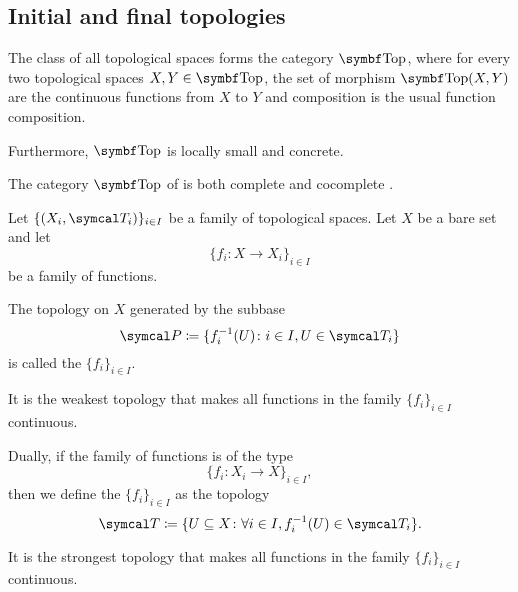 \subsection{Initial and final topologies}\label{subsec:initial_final_topologies}

\begin{definition}\label{def:category_of_topological_spaces}
  The class of all topological spaces forms the category \( \Bold{Top} \), where for every two topological spaces \( X, Y \in \Bold{Top} \), the set of morphism \( \Bold{Top}(X, Y) \) are the continuous functions from \( X \) to \( Y \) and composition is the usual function composition.

  Furthermore, \( \Bold{Top} \) is locally small and concrete.
\end{definition}

\begin{theorem}\label{thm:top_complete_cocomplete}
  The category \( \Bold{Top} \) of is both complete  and cocomplete .
\end{theorem}

\begin{definition}\label{def:initial_topology}\cite{nLab:top}
  Let \( \{ (X_i, \Cal{T}_i) \}_{i \in I} \) be a family of topological spaces. Let \( X \) be a bare set and let
  \begin{equation*}
    \{ f_i: X \to X_i \}_{i \in I}
  \end{equation*}
  be a family of functions.

  The topology on \( X \) generated by the subbase
  \begin{equation*}
    \Cal{P} \coloneqq \{ f_i^{-1}(U) \colon i \in I, U \in \Cal{T}_i \}
  \end{equation*}
  is called the  \( \{ f_i \}_{i \in I} \).

  It is the weakest topology that makes all functions in the family \( \{ f_i \}_{i \in I} \) continuous.
\end{definition}

\begin{definition}\label{def:final_topology}\cite{nLab:top}
  Dually, if the family of functions is of the type
  \begin{equation*}
    \{ f_i: X_i \to X \}_{i \in I},
  \end{equation*}
  then we define the  \( \{ f_i \}_{i \in I} \) as the topology
  \begin{equation*}
    \Cal{T} \coloneqq \{ U \subseteq X \colon \forall i \in I, f_i^{-1}(U) \in \Cal{T}_i \}.
  \end{equation*}

  It is the strongest topology that makes all functions in the family \( \{ f_i \}_{i \in I} \) continuous.
\end{definition}

